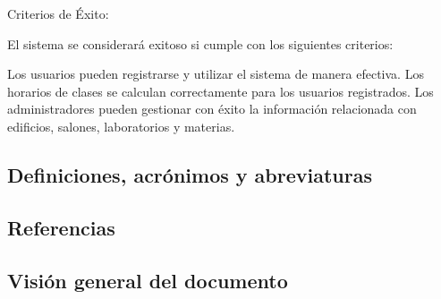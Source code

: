 Criterios de Éxito:

El sistema se considerará exitoso si cumple con los siguientes criterios:

Los usuarios pueden registrarse y utilizar el sistema de manera efectiva.
Los horarios de clases se calculan correctamente para los usuarios registrados.
Los administradores pueden gestionar con éxito la información relacionada con edificios, salones, laboratorios y materias.

\subsection{Definiciones, acrónimos y abreviaturas}



\subsection{Referencias}

\subsection{Visión general del documento}
